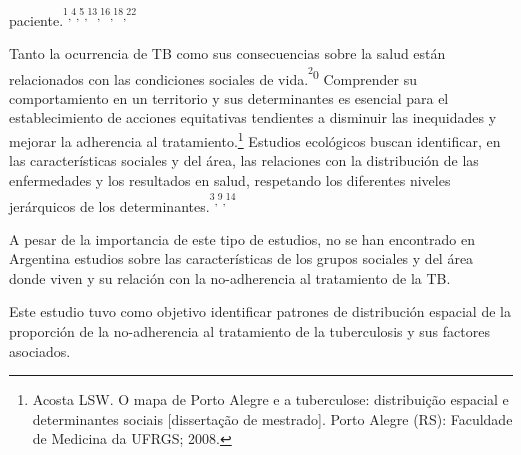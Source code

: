 \begin{multicols}{2}
paciente.\allowbreak{}\textsuperscript{\textsuperscript{1}}\textsuperscript{,\allowbreak{}}\textsuperscript{\textsuperscript{4}}\textsuperscript{,\allowbreak{}}\textsuperscript{\textsuperscript{5}}\textsuperscript{,\allowbreak{}}\textsuperscript{\textsuperscript{13}}\textsuperscript{,\allowbreak{}}\textsuperscript{\textsuperscript{16}}\textsuperscript{,\allowbreak{}}\textsuperscript{\textsuperscript{18}}\textsuperscript{,\allowbreak{}}\textsuperscript{\textsuperscript{22}}\par{}Tanto la ocurrencia de TB como sus consecuencias sobre la salud están relacionados con las condiciones sociales de vida.\allowbreak{}\textsuperscript{\textsuperscript{2}}\textsuperscript{0} Comprender su comportamiento en un territorio y sus determinantes es esencial para el establecimiento de acciones equitativas tendientes a disminuir las inequidades y mejorar la adherencia al tratamiento.\allowbreak{}\protect\footnote{ Acosta LSW.\allowbreak{} O mapa de Porto Alegre e a tuberculose:\allowbreak{} distribuição espacial e determinantes sociais [dissertação de mestrado].\allowbreak{} Porto Alegre (\allowbreak{}RS)\allowbreak{}:\allowbreak{} Faculdade de Medicina da UFRGS; 2008.\allowbreak{}} Estudios ecológicos buscan identificar,\allowbreak{} en las características sociales y del área,\allowbreak{} las relaciones con la distribución de las enfermedades y los resultados en salud,\allowbreak{} respetando los diferentes niveles jerárquicos de los determinantes.\allowbreak{}\textsuperscript{\textsuperscript{3}}\textsuperscript{,\allowbreak{}}\textsuperscript{\textsuperscript{9}}\textsuperscript{,\allowbreak{}}\textsuperscript{\textsuperscript{14}}\par{}A pesar de la importancia de este tipo de estudios,\allowbreak{} no se han encontrado en Argentina estudios sobre las características de los grupos sociales y del área donde viven y su relación con la no-\allowbreak{}adherencia al tratamiento de la TB.\allowbreak{}\par{}Este estudio tuvo como objetivo identificar patrones de distribución espacial de la proporción de la no-\allowbreak{}adherencia al tratamiento de la tuberculosis y sus factores asociados.\allowbreak{}

\end{multicols}
